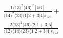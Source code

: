 \documentclass[varwidth, border=5pt]{standalone}
\begin{document}
\begin{my}
$\begin{gathered}
\scriptscriptstyle\frac{1⟨13⟩^2⟨46⟩^2[56]}{⟨14⟩^2⟨23⟩⟨1|2+3|4]s_{123}}+\\
\scriptscriptstyle\frac{2⟨13⟩^2⟨46⟩⟨2|1+3|5]}{⟨12⟩⟨14⟩⟨23⟩⟨1|2+3|4]s_{123}}\phantom{+}
\end{gathered}$
\end{my}
\end{document}
